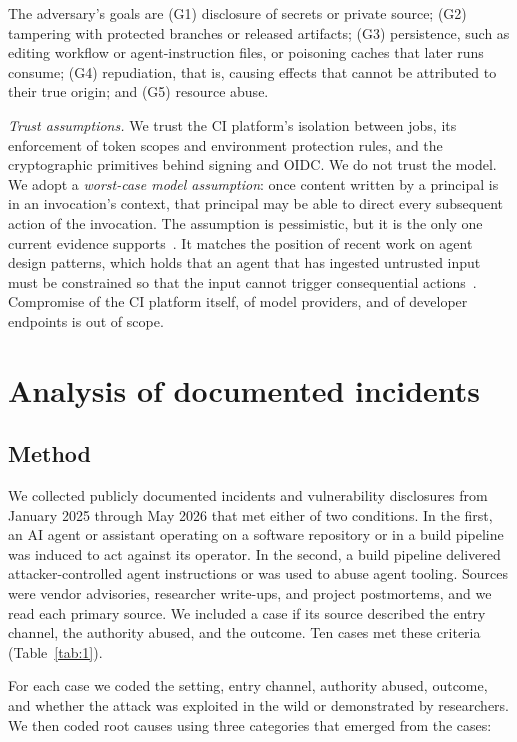 \documentclass[acmsmall,screen,review]{acmart}
\begin{document}
The adversary's goals are (G1) disclosure of secrets or private source; (G2) tampering with protected branches or released artifacts; (G3) persistence, such as editing workflow or agent-instruction files, or poisoning caches that later runs consume; (G4) repudiation, that is, causing effects that cannot be attributed to their true origin; and (G5) resource abuse.

\emph{Trust assumptions.} We trust the CI platform's isolation between jobs, its enforcement of token scopes and environment protection rules, and the cryptographic primitives behind signing and OIDC. We do not trust the model. We adopt a \emph{worst-case model assumption}: once content written by a principal is in an invocation's context, that principal may be able to direct every subsequent action of the invocation. The assumption is pessimistic, but it is the only one current evidence supports~\cite{nasr2025attacker}. It matches the position of recent work on agent design patterns, which holds that an agent that has ingested untrusted input must be constrained so that the input cannot trigger consequential actions~\cite{beurerkellner2025design}. Compromise of the CI platform itself, of model providers, and of developer endpoints is out of scope.


\section{Analysis of documented incidents}\label{sec:4}


\subsection{Method}\label{sec:4.1}

We collected publicly documented incidents and vulnerability disclosures from January 2025 through May 2026 that met either of two conditions. In the first, an AI agent or assistant operating on a software repository or in a build pipeline was induced to act against its operator. In the second, a build pipeline delivered attacker-controlled agent instructions or was used to abuse agent tooling. Sources were vendor advisories, researcher write-ups, and project postmortems, and we read each primary source. We included a case if its source described the entry channel, the authority abused, and the outcome. Ten cases met these criteria (Table~\ref{tab:1}).

For each case we coded the setting, entry channel, authority abused, outcome, and whether the attack was exploited in the wild or demonstrated by researchers. We then coded root causes using three categories that emerged from the cases:
\end{document}
